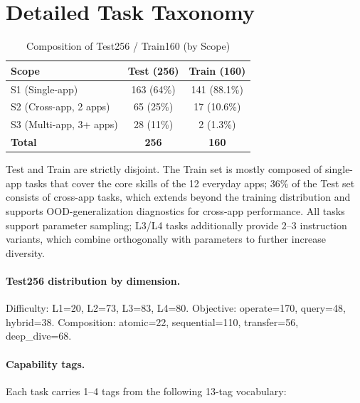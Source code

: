 \section{Detailed Task Taxonomy}\label{app:taxonomy}

\begin{table}[!htbp]
  \centering\small
  \setlength{\tabcolsep}{3pt}
  \begin{tabular}{lcc}
    \toprule
    \textbf{Scope} & \textbf{Test (256)} & \textbf{Train (160)} \\
    \midrule
    S1 (Single-app)      & 163 (64\%)   & 141 (88.1\%) \\
    S2 (Cross-app, 2 apps)  & 65 (25\%)    & 17 (10.6\%)  \\
    S3 (Multi-app, 3+ apps) & 28 (11\%)    & 2 (1.3\%)      \\
    \midrule
    \textbf{Total}     & \textbf{256} & \textbf{160} \\
    \bottomrule
  \end{tabular}
  \caption{Composition of Test256 / Train160 (by Scope)}
  \label{tab:task-composition}
\end{table}

Test and Train are strictly disjoint. The Train set is mostly composed of single-app tasks that cover the core skills of the 12 everyday apps; 36\% of the Test set consists of cross-app tasks, which extends beyond the training distribution and supports OOD-generalization diagnostics for cross-app performance. All tasks support parameter sampling; L3/L4 tasks additionally provide 2--3 instruction variants, which combine orthogonally with parameters to further increase diversity.

\paragraph{Test256 distribution by dimension.} Difficulty: L1=20, L2=73, L3=83, L4=80. Objective: operate=170, query=48, hybrid=38. Composition: atomic=22, sequential=110, transfer=56, deep\_dive=68.

\paragraph{Capability tags.} Each task carries 1--4 tags from the following 13-tag vocabulary:

